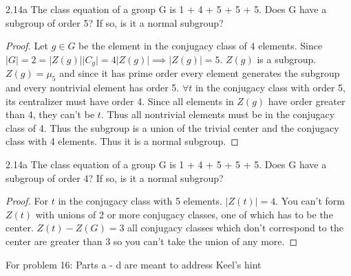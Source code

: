 \documentclass{article}
\newcommand{\abs}[1]{\lvert #1\rvert}
\begin{document}
\bigskip

\begin{PROB}{2.14a}\label{Problem 2.14a.}
    The class equation of a group G is 1 + 4 + 5 + 5 + 5. Does G have a subgroup of order 5? If so, is it a normal subgroup?
\end{PROB}
\begin{proof}
    Let $g \in G$ be the element in the conjugacy class of $4$ elements. Since $\abs{G} = 2 = \abs{Z(g)}\abs{C_g} = 4\abs{Z(g)} \implies \abs{Z(g)} = 5$. $Z(g)$ is a subgroup. $Z(g) = \mu_5$ and since it has prime order every element generates the subgroup and every nontrivial element has order 5. $\forall t$ in the conjugacy class with order 5, its centralizer must have order 4. Since all elements in $Z(g)$ have order greater than 4, they can't be $t$. Thus all nontrivial elements must be in the conjugacy class of 4. Thus the subgroup is a union of the trivial center and the conjugacy class with 4 elements. Thus it is a normal subgroup.
\end{proof}


\begin{PROB}{2.14a}\label{Problem 2.14a.}
    The class equation of a group G is 1 + 4 + 5 + 5 + 5. Does G have a subgroup of order 4? If so, is it a normal subgroup?
\end{PROB}
\begin{proof}
    For $t$ in the conjugacy class with 5 elements. $\abs{Z(t)} = 4$. You can't form $Z(t)$ with unions of 2 or more conjugacy classes, one of which has to be the center. $Z(t) - Z(G) = 3$ all conjugacy classes which don't correspond to the center are greater than 3 so you can't take the union of any more.
\end{proof}

\bigskip

For problem 16: Parts a - d are meant to address Keel's hint
\end{document}
